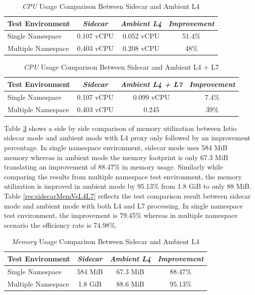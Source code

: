 \begin{table}[ht!]
  \centering
  \begin{tabular}{ |l|c|c|c| }
    \hline
    \textbf{Test Environment} & \textbf{\textit{Sidecar}} & \textbf{\textit{Ambient L4}} & \textbf{\textit{Improvement}}\\ \hline
    Single Namespace & 0.107 vCPU & 0.052 vCPU & 51.4\% \\ \hline
    Multiple Namespace & 0.403 vCPU & 0.208 vCPU & 48\% \\ \hline
  \end{tabular}
  \caption{\textit{CPU} Usage Comparison Between Sidecar and Ambient L4}
  \label{sidecarCpuVsL4}
\end{table}


\begin{table}[ht!]
  \centering
  \begin{tabular}{ |l|c|c|c| }
    \hline
    \textbf{Test Environment} & \textbf{\textit{Sidecar}} & \textbf{\textit{Ambient L4 + L7}} & \textbf{\textit{Improvement}}\\ \hline
    Single Namespace & 0.107 vCPU & 0.099 vCPU & 7.4\% \\ \hline
    Multiple Namespace & 0.403 vCPU & 0.245 & 39\% \\ \hline
  \end{tabular}
  \caption{\textit{CPU} Usage Comparison Between Sidecar and Ambient L4 + L7}
  \label{sidecarCpuVsL4L7}
\end{table}

Table \ref{res:sidecarMemVsL4} shows a side by side comparison of memory utilization between Istio sidecar mode and ambient mode with L4 proxy only followed by an improvement percentage. In single namespace environment, sidecar mode uses 584 MiB memory whereas in ambient mode the memory footprint is only 67.3 MiB translating an improvement of 88.47\% in memory usage. Similarly while comparing the results from multiple namespace test environment, the memory utilization is improved in ambient mode by 95.13\% from 1.8 GiB to only 88 MiB. Table \ref{res:sidecarMemVsL4L7} reflects the test comparison result between sidecar mode and ambient mode with both L4 and L7 processing. In single namespace test environment, the improvement is 79.45\% whereas in multiple namespace scenario the efficiency rate is 74.98\%.

\begin{table}[ht!]
  \centering
  \begin{tabular}{ |l|c|c|c| }
    \hline
    \textbf{Test Environment} & \textbf{\textit{Sidecar}} & \textbf{\textit{Ambient L4}} & \textbf{\textit{Improvement}}\\ \hline
    Single Namespace & 584 MiB & 67.3 MiB & 88.47\% \\ \hline
    Multiple Namespace & 1.8 GiB & 88.6 MiB & 95.13\% \\ \hline
  \end{tabular}
  \caption{\textit{Memory} Usage Comparison Between Sidecar and Ambient L4}
  \label{res:sidecarMemVsL4}
\end{table}



